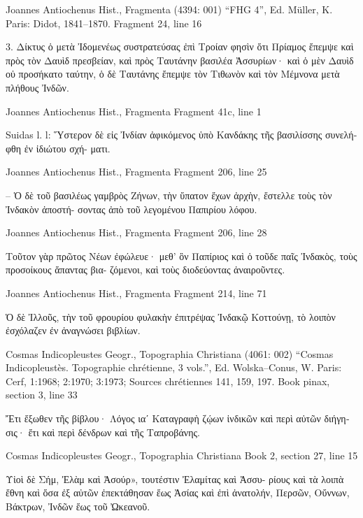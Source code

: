 \documentclass[12pt,letterpaper,twoside,final]{memoir}
\begin{document}
\begin{greek}
Joannes Antiochenus Hist., Fragmenta (4394: 001)
“FHG 4”, Ed. Müller, K.
Paris: Didot, 1841–1870.
Fragment 24, line 16

3. Δίκτυς ὁ μετὰ Ἰδομενέως συστρατεύσας ἐπὶ 
Τροίαν φησὶν ὅτι Πρίαμος ἔπεμψε καὶ πρὸς τὸν Δαυὶδ 
πρεσβείαν, καὶ πρὸς Ταυτάνην βασιλέα Ἀσσυρίων· 
καὶ ὁ μὲν Δαυὶδ οὐ προσήκατο ταύτην, ὁ δὲ Ταυτάνης 
ἔπεμψε τὸν Τιθωνὸν καὶ τὸν Μέμνονα μετὰ πλήθους 
Ἰνδῶν. 



Joannes Antiochenus Hist., Fragmenta 
Fragment 41c, line 1

Suidas l. l: Ὕστερον δὲ εἰς Ἰνδίαν ἀφικόμενος ὑπὸ 
Κανδάκης τῆς βασιλίσσης συνελήφθη ἐν ἰδιώτου σχή-
ματι. 



Joannes Antiochenus Hist., Fragmenta 
Fragment 206, line 25

      – Ὁ δὲ τοῦ βασιλέως γαμβρὸς Ζήνων, τὴν 
ὕπατον ἔχων ἀρχὴν, ἔστελλε τοὺς τὸν Ἰνδακὸν ἀποστή-
σοντας ἀπὸ τοῦ λεγομένου Παπιρίου λόφου. 



Joannes Antiochenus Hist., Fragmenta 
Fragment 206, line 28

                                                Τοῦτον 
γὰρ πρῶτος Νέων ἐφώλευε· μεθ' ὃν Παπίριος καὶ 
ὁ τοῦδε παῖς Ἰνδακὸς, τοὺς προσοίκους ἅπαντας βια-
ζόμενοι, καὶ τοὺς διοδεύοντας ἀναιροῦντες. 



Joannes Antiochenus Hist., Fragmenta 
Fragment 214, line 71

                                          Ὁ δὲ Ἰλλοῦς, τὴν 
τοῦ φρουρίου φυλακὴν ἐπιτρέψας Ἰνδακῷ Κοττούνῃ, τὸ 
λοιπὸν ἐσχόλαζεν ἐν ἀναγνώσει βιβλίων. 



Cosmas Indicopleustes Geogr., Topographia Christiana (4061: 002)
“Cosmas Indicopleustès. Topographie chrétienne, 3 vols.”, Ed. Wolska–Conus, W.
Paris: Cerf, 1:1968; 2:1970; 3:1973; Sources chrétiennes 141, 159, 197.
Book pinax, section 3, line 33

Ἔτι ἔξωθεν τῆς βίβλου· Λόγος ιαʹ 
 Καταγραφὴ ζῴων ἰνδικῶν καὶ περὶ αὐτῶν διήγησις· ἔτι καὶ 
περὶ δένδρων καὶ τῆς Ταπροβάνης. 



Cosmas Indicopleustes Geogr., Topographia Christiana 
Book 2, section 27, line 15

                                                              Υἱοὶ δὲ 
Σήμ, Ἐλὰμ καὶ Ἀσούρ», τουτέστιν Ἐλαμίτας καὶ Ἀσσυ-
ρίους καὶ τὰ λοιπὰ ἔθνη καὶ ὅσα ἐξ αὐτῶν ἐπεκτάθησαν 
ἕως Ἀσίας καὶ ἐπὶ ἀνατολήν, Περσῶν, Οὔννων, Βάκτρων, 
Ἰνδῶν ἕως τοῦ Ὠκεανοῦ. 




\end{greek}
\end{document}
